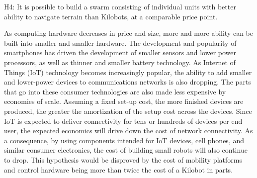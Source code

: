 H4: It is possible to build a swarm consisting of individual units with better ability to navigate terrain than Kilobots, at a comparable price point. 

As computing hardware decreases in price and size, more and more ability can be built into smaller and smaller hardware. 
The development and popularity of smartphones has driven the development of smaller sensors and lower power processors, as well as thinner and smaller battery technology. 
As Internet of Things (IoT) technology becomes increasingly popular, the ability to add smaller and lower-power devices to communications networks is also dropping. 
The parts that go into these consumer technologies are also made less expensive by economies of scale. 
Assuming a fixed set-up cost, the more finished devices are produced, the greater the amortization of the setup cost across the devices. 
Since IoT is expected to deliver connectivity for tens or hundreds of devices per end user, the expected economics will drive down the cost of network connectivity.
As a consequence, by using components intended for IoT devices, cell phones, and similar consumer electronics, the cost of building small robots will also continue to drop.
This hypothesis would be disproved by the cost of mobility platforms and control hardware being more than twice the cost of a Kilobot in parts. 
